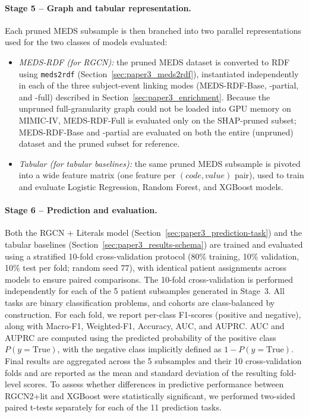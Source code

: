 \paragraph{Stage 5 -- Graph and tabular representation.} Each pruned MEDS subsample is then branched into two parallel representations used for the two classes of models evaluated:
\begin{itemize}
  \item \emph{MEDS-RDF (for RGCN):} the pruned MEDS dataset is converted to RDF using \texttt{meds2rdf} (Section~\ref{sec:paper3_meds2rdf}), instantiated independently in each of the three subject-event linking modes (MEDS-RDF-Base, -partial, and -full) described in Section~\ref{sec:paper3_enrichment}. Because the unpruned full-granularity graph could not be loaded into GPU memory on MIMIC-IV, MEDS-RDF-Full is evaluated only on the SHAP-pruned subset; MEDS-RDF-Base and -partial are evaluated on both the entire (unpruned) dataset and the pruned subset for reference.
  \item \emph{Tabular (for tabular baselines):} the same pruned MEDS subsample is pivoted into a wide feature matrix (one feature per $(code, value)$ pair), used to train and evaluate Logistic Regression, Random Forest, and XGBoost models.
\end{itemize}

\paragraph{Stage 6 -- Prediction and evaluation.}
Both the RGCN + Literals model (Section~\ref{sec:paper3_prediction-task}) and the tabular baselines (Section~\ref{sec:paper3_results-schema}) are trained and evaluated using a stratified 10-fold cross-validation protocol (80\% training, 10\% validation, 10\% test per fold; random seed 77), with identical patient assignments across models to ensure paired comparisons. The 10-fold cross-validation is performed independently for each of the 5 patient subsamples generated in Stage~3. All tasks are binary classification problems, and cohorts are class-balanced by construction. For each fold, we report per-class F1-scores (positive and negative), along with Macro-F1, Weighted-F1, Accuracy, AUC, and AUPRC. AUC and AUPRC are computed using the predicted probability of the positive class $P(y=\text{True})$, with the negative class implicitly defined as $1 - P(y=\text{True})$. Final results are aggregated across the 5 subsamples and their 10 cross-validation folds and are reported as the mean and standard deviation of the resulting fold-level scores. To assess whether differences in predictive performance between RGCN2+lit and XGBoost were statistically significant, we performed two-sided paired t-tests separately for each of the 11 prediction tasks. %

